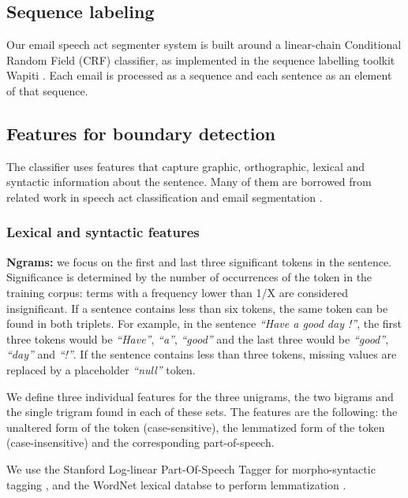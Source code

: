 \documentclass[11pt]{article}
\begin{document}
\subsection{Sequence labeling}

Our email speech act segmenter system is built around a linear-chain Conditional Random Field (CRF) classifier, as implemented in the sequence labelling toolkit Wapiti \cite{lavergne2010practical}. Each email is processed as a sequence and each sentence as an element of that sequence.

\subsection{Features for boundary detection}

The classifier uses features that capture graphic, orthographic, lexical and syntactic information about the sentence. Many of them are borrowed from related work in speech act classification \cite{qadir2011classifying} and email segmentation \cite{lampert2009segmenting}.

\subsubsection{Lexical and syntactic features}

\textbf{Ngrams:} we focus on the first and last three significant tokens in the sentence. Significance is determined by the number of occurrences of the token in the training corpus: terms with a frequency lower than 1/X  are considered insignificant. If a sentence contains less than six tokens, the same token can be found in both triplets. For example, in the sentence \textit{``Have a good day !''}, the first three tokens would be \textit{``Have''}, \textit{``a''}, \textit{``good''} and the last three would be \textit{``good''}, \textit{``day''} and \textit{``!''}. If the sentence contains less than three tokens, missing values are replaced by a placeholder \textit{``null''} token.

We define three individual features for the three unigrams, the two bigrams and the single trigram found in each of these sets. The features are the following: the unaltered form of the token (case-sensitive), the lemmatized form of the token (case-insensitive) and the corresponding part-of-speech.

We use the Stanford Log-linear Part-Of-Speech Tagger for morpho-syntactic tagging \cite{toutanova2003feature}, and the WordNet lexical databse to perform lemmatization \cite{miller1995wordnet}.
\end{document}
